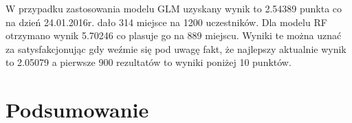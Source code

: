 \documentclass[11pt]{article} %
\begin{document}
W przypadku zastosowania modelu GLM uzyskany wynik to 2.54389 punkta co na dzień 24.01.2016r. dało 314 miejsce na 1200 uczestników. Dla modelu RF otrzymano wynik 5.70246 co plasuje go na 889 miejscu. Wyniki te można uznać za satysfakcjonując gdy weźmie się pod uwagę fakt, że najlepszy aktualnie wynik to 2.05079 a pierwsze 900 rezultatów to wyniki poniżej 10 punktów.\\


\section{Podsumowanie}
\end{document}
